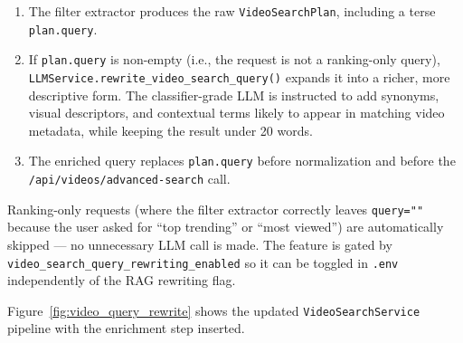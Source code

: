 \begin{enumerate}
  \item The filter extractor produces the raw \texttt{VideoSearchPlan}, including a terse
    \texttt{plan.query}.
  \item If \texttt{plan.query} is non-empty (i.e., the request is not a ranking-only query),
    \texttt{LLMService.rewrite\_video\_search\_query()} expands it into a richer, more
    descriptive form. The classifier-grade LLM is instructed to add synonyms, visual
    descriptors, and contextual terms likely to appear in matching video metadata, while keeping
    the result under 20 words.
  \item The enriched query replaces \texttt{plan.query} before normalization and before the
    \texttt{/api/videos/advanced-search} call.
\end{enumerate}

Ranking-only requests (where the filter extractor correctly leaves \texttt{query=""} because
the user asked for ``top trending'' or ``most viewed'') are automatically skipped — no
unnecessary LLM call is made. The feature is gated by
\texttt{video\_search\_query\_rewriting\_enabled} so it can be toggled in \texttt{.env}
independently of the RAG rewriting flag.

Figure~\ref{fig:video_query_rewrite} shows the updated \texttt{VideoSearchService} pipeline
with the enrichment step inserted.

